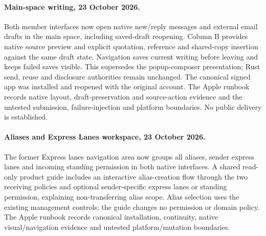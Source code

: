 \documentclass[11pt]{article}
\begin{document}
\paragraph{Main-space writing, 23 October 2026.}
Both member interfaces now open native new/reply messages and external email drafts
in the main space, including saved-draft reopening. Column B provides native
source preview and explicit quotation, reference and shared-copy insertion against
the same draft state. Navigation saves current writing before leaving and keeps
failed saves visible. This supersedes the popup-composer presentation; Rust send,
reuse and disclosure authorities remain unchanged. The canonical signed app was
installed and reopened with the original account. The Apple runbook records native
layout, draft-preservation and source-action evidence and the untested submission,
failure-injection and platform boundaries. No public delivery is established.


\paragraph{Aliases and Express Lanes workspace, 23 October 2026.}
The former Express lanes navigation area now groups all aliases, sender express
lanes and incoming standing permission in both native interfaces. A shared
read-only product guide includes an interactive alias-creation flow through the
two receiving policies and optional sender-specific express lanes or standing
permission, explaining non-transferring alias scope. Alias
selection uses the existing management controls; the guide changes no permission
or domain policy. The Apple runbook records canonical installation, continuity,
native visual/navigation evidence and untested platform/mutation boundaries.
\end{document}
